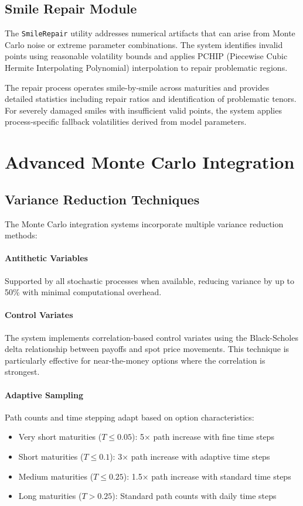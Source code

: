 	\subsection{Smile Repair Module}\label{subsec:repair}
	
	The \texttt{SmileRepair} utility addresses numerical artifacts that can arise from Monte Carlo noise or extreme parameter combinations. The system identifies invalid points using reasonable volatility bounds and applies PCHIP (Piecewise Cubic Hermite Interpolating Polynomial) interpolation to repair problematic regions.
	
	The repair process operates smile-by-smile across maturities and provides detailed statistics including repair ratios and identification of problematic tenors. For severely damaged smiles with insufficient valid points, the system applies process-specific fallback volatilities derived from model parameters.
	
	\section{Advanced Monte Carlo Integration}
	
	\subsection{Variance Reduction Techniques}
	
	The Monte Carlo integration systems incorporate multiple variance reduction methods:
	
	\paragraph{Antithetic Variables} Supported by all stochastic processes when available, reducing variance by up to 50\% with minimal computational overhead.
	
	\paragraph{Control Variates} The system implements correlation-based control variates using the Black-Scholes delta relationship between payoffs and spot price movements. This technique is particularly effective for near-the-money options where the correlation is strongest.
	
	\paragraph{Adaptive Sampling} Path counts and time stepping adapt based on option characteristics:
	\begin{itemize}[nosep]
		\item Very short maturities ($T \leq 0.05$): 5× path increase with fine time steps
		\item Short maturities ($T \leq 0.1$): 3× path increase with adaptive time steps  
		\item Medium maturities ($T \leq 0.25$): 1.5× path increase with standard time steps
		\item Long maturities ($T > 0.25$): Standard path counts with daily time steps
	\end{itemize}
	
